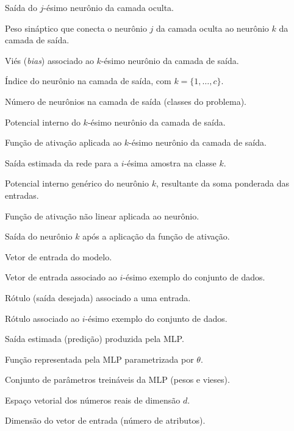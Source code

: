 \documentclass[
	12pt,				%
	oneside,
	a4paper,			%
	english,			%
	french,				%
	spanish,			%
	brazil				%
	]{abntex2}
\begin{document}
\begin{simbolos}
\item[\textbf{$f^{h}_{j}(\mathrm{rede}^{h}_{j})$}] Saída do $j$-ésimo neurônio da camada oculta.
\item[\textbf{$\omega^{o}_{k,j}$}] Peso sináptico que conecta o neurônio $j$ da camada oculta ao neurônio $k$ da camada de saída.
\item[\textbf{$\theta^{o}_{k}$}] Viés (\textit{bias}) associado ao $k$-ésimo neurônio da camada de saída.
\item[\textbf{$k$}] Índice do neurônio na camada de saída, com $k = \{1,\ldots,c\}$.
\item[\textbf{$c$}] Número de neurônios na camada de saída (classes do problema).
\item[\textbf{$\mathrm{rede}^{o}_{k}$}] Potencial interno do $k$-ésimo neurônio da camada de saída.
\item[\textbf{$f^{o}_{k}(\cdot)$}] Função de ativação aplicada ao $k$-ésimo neurônio da camada de saída.
\item[\textbf{$\hat{y}_{i,k}$}] Saída estimada da rede para a $i$-ésima amostra na classe $k$.
\item[\textbf{$v_k$}] Potencial interno genérico do neurônio $k$, resultante da soma ponderada das entradas.
\item[\textbf{$\varphi(\cdot)$}] Função de ativação não linear aplicada ao neurônio.
\item[\textbf{$y_k$}] Saída do neurônio $k$ após a aplicação da função de ativação.

\item[\textbf{$x$}] Vetor de entrada do modelo.
\item[\textbf{$x_i$}] Vetor de entrada associado ao $i$-ésimo exemplo do conjunto de dados.
\item[\textbf{$y$}] Rótulo (saída desejada) associado a uma entrada.
\item[\textbf{$y_i$}] Rótulo associado ao $i$-ésimo exemplo do conjunto de dados.
\item[\textbf{$\hat{y}$}] Saída estimada (predição) produzida pela MLP.
\item[\textbf{$f_{\theta}(\cdot)$}] Função representada pela MLP parametrizada por $\theta$.
\item[\textbf{$\theta$}] Conjunto de parâmetros treináveis da MLP (pesos e vieses).

\item[\textbf{$\mathbb{R}^{d}$}] Espaço vetorial dos números reais de dimensão $d$.
\item[\textbf{$d$}] Dimensão do vetor de entrada (número de atributos).


\end{simbolos}
\end{document}
